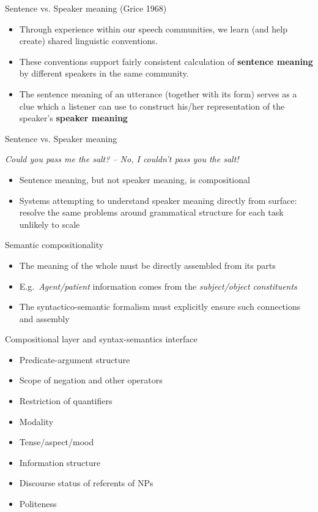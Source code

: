 \documentclass{beamer}
\begin{document}
\begin{frame}{Sentence vs. Speaker meaning (Grice 1968)}
  \begin{itemize}
  \item Through experience within our speech communities, we learn (and help create) shared linguistic conventions.
  \item These conventions support fairly consistent calculation of
    {\bf sentence meaning} by different speakers in the same
    community.
  \item The sentence meaning of an utterance (together with its form)
    serves as a clue which a listener can use to construct his/her
    representation of the speaker's {\bf speaker meaning}
  \end{itemize}
\end{frame}

\begin{frame}{Sentence vs. Speaker meaning}

  {\it Could you pass me the salt? -- No, I couldn't pass you the salt!}

  \vspace{1cm}

  \begin{itemize}
  \item Sentence meaning, but not speaker meaning, is compositional
  \item Systems attempting to understand speaker meaning directly from
    surface: resolve the same problems around grammatical structure
    for each task unlikely to scale
\end{itemize}
\end{frame}

\begin{frame}{Semantic compositionality}
  \begin{itemize}
  \item The meaning of the whole must be directly assembled from its parts
  \item E.g.\ {\it Agent/patient} information comes from the {\it subject/object constituents}
  \item The syntactico-semantic formalism must explicitly ensure such connections and assembly
  \end{itemize}
\end{frame}

\begin{frame}{Compositional layer and syntax-semantics interface}
  \begin{itemize}
  \item Predicate-argument structure
  \item Scope of negation and other operators
  \item Restriction of quantifiers
  \item Modality
  \item Tense/aspect/mood
  \item Information structure
  \item Discourse status of referents of NPs
  \item Politeness
  \end{itemize}
\end{frame}
\end{document}
